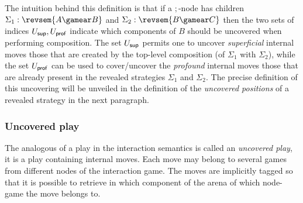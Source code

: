 The intuition behind this definition is that if a $;$-node has
children $\Sigma_1 : \revsem{A\gamear
B}$ and $\Sigma_2 : \revsem{B\gamear C}$ then the two
sets of indices $U_{\sf sup}, U_{\sf prof}$ indicate which components of $B$ should be
uncovered when performing composition. The set $U_{\sf sup}$ permits one to uncover \emph{superficial} internal moves \ie those that are created by the top-level composition (of $\Sigma_1$ with $\Sigma_2$), while the set $U_{\sf prof}$ can be used to cover/uncover the \emph{profound} internal moves \ie those that are already present in the revealed strategies $\Sigma_1$ and $\Sigma_2$.
The precise definition of this uncovering will be unveiled in the definition of the \emph{uncovered positions} of a revealed strategy in
the next paragraph.

\subsubsection{Uncovered play}

The analogous of a play in the interaction semantics is called an
\emph{uncovered play}, it is a play containing internal moves. Each move may belong to several games
from different nodes of the interaction game.
The moves are implicitly tagged so that it is possible to retrieve in
which component of the arena of which node-game the move belongs to.

